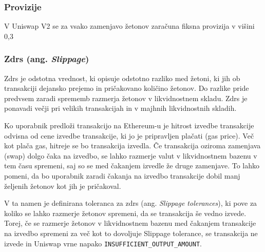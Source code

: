\documentclass[a4paper,12pt]{article}%
\begin{document}
\subsubsection{ Provizije}
V Uniswap V2 se za vsako zamenjavo žetonov zaračuna fiksna provizija v višini 0,3 %

\subsubsection{Zdrs (ang. \textit{Slippage})}
Zdrs je odstotna vrednost, ki opisuje odstotno razliko med žetoni, ki jih ob transakciji dejansko prejemo in pričakovano količino žetonov. Do razlike pride predvsem zaradi sprememb razmerja žetonov v likvidnostnem skladu. Zdrs je ponavadi večji pri velikih transakcijah in v majhnih likvidnostnih skladih.

Ko uporabnik predloži transakcijo na Ethereum-u je hitrost izvedbe transakcije odvisna od cene izvedbe transakcije, ki jo je pripravljen plačati (gas price). Več kot plača gas, hitreje se bo transakcija izvedla. Če transakcija oziroma zamenjava (swap) dolgo čaka na izvedbo, se lahko razmerje valut v likvidnostnem bazenu v tem času spremeni, saj so se med čakanjem izvedle že druge zamenjave. To lahko pomeni, da bo uporabnik zaradi čakanja na izvedbo transakcije dobil manj željenih žetonov kot jih je pričakoval. 

V ta namen je definirana toleranca za zdrs (ang. \textit{Slippage tolerances}), ki pove za koliko se lahko razmerje žetonov spremeni, da se transakcija še vedno izvede. Torej, če se razmerje žetonov v likvidnostnem bazenu med čakanjem transakcije na izvedbo spremeni za več kot to dovoljuje Slippage tolerance, se transakcija ne izvede in Uniswap vrne napako \texttt{INSUFFICIENT\_OUTPUT\_AMOUNT}. 
\end{document}
